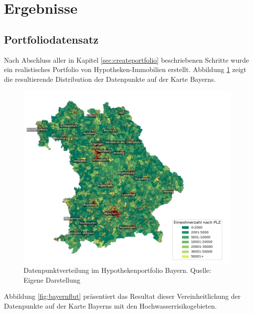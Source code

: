 \section{Ergebnisse}\label{kap:5}
\subsection{Portfoliodatensatz}
Nach Abschluss aller in Kapitel \ref{sec:createportfolio} beschriebenen Schritte wurde ein realistisches Portfolio von Hypotheken-Immobilien erstellt.
Abbildung \ref{fig:hypothekenportfolio} zeigt die resultierende Distribution der Datenpunkte auf der Karte Bayerns.

\begin{figure}[htbp]
    \centering
    \includegraphics[width=1.2\textwidth]{figures/bayern_por_pop.png} 
    \caption{Datenpunktverteilung im Hypothekenportfolio Bayern. Quelle: Eigene Darstellung}
    \label{fig:hypothekenportfolio}
\end{figure}
\FloatBarrier
\clearpage
Abbildung \ref{fig:bayernflut} präsentiert das Resultat dieser Vereinheitlichung der Datenpunkte auf der Karte Bayerns mit den Hochwasserrisikogebieten.

